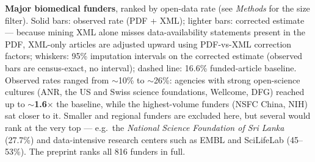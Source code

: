 \documentclass{article}
\begin{document}
\begin{poster}
{        \textbf{Major biomedical funders}, ranked by open-data rate (see \emph{Methods} for the size filter). Solid bars: observed rate (PDF + XML); lighter bars: corrected estimate --- because mining XML alone misses data-availability statements present in the PDF, XML-only articles are adjusted upward using PDF-vs-XML correction factors; whiskers: 95\% imputation intervals on the corrected estimate (observed bars are census-exact, no interval); dashed line: 16.6\% funded-article baseline. Observed rates ranged from ${\sim}$10\% to ${\sim}$26\%: agencies with strong open-science cultures (ANR, the US and Swiss science foundations, Wellcome, DFG) reached up to ${\sim}$\textbf{1.6$\times$} the baseline, while the highest-volume funders (NSFC China, NIH) sat closer to it. Smaller and regional funders are excluded here, but several would rank at the very top --- e.g.\ the \emph{National Science Foundation of Sri Lanka} (27.7\%) and data-intensive research centers such as EMBL and SciLifeLab (45--53\%). The preprint ranks all 816 funders in full.
    }


\end{poster}
\end{document}
